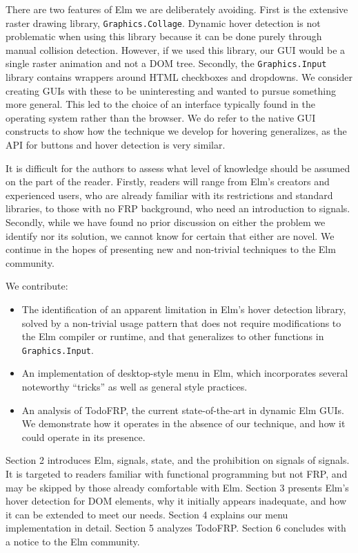 \documentclass{article}
\begin{document}
There are two features of Elm we are deliberately avoiding. First is the
extensive raster drawing library, \texttt{Graphics.Collage}. Dynamic
hover detection is not problematic when using this library because it
can be done purely through manual collision detection. However, if we
used this library, our GUI would be a single raster animation and not a
DOM tree. Secondly, the \texttt{Graphics.Input} library contains
wrappers around HTML checkboxes and dropdowns. We consider creating GUIs
with these to be uninteresting and wanted to pursue something more
general. This led to the choice of an interface typically found in the
operating system rather than the browser. We do refer to the native GUI
constructs to show how the technique we develop for hovering
generalizes, as the API for buttons and hover detection is very similar.

It is difficult for the authors to assess what level of knowledge should
be assumed on the part of the reader. Firstly, readers will range from
Elm's creators and experienced users, who are already familiar with its
restrictions and standard libraries, to those with no FRP background,
who need an introduction to signals. Secondly, while we have found no
prior discussion on either the problem we identify nor its solution, we
cannot know for certain that either are novel. We continue in the hopes
of presenting new and non-trivial techniques to the Elm community.

We contribute:

\begin{itemize}
\itemsep1pt\parskip0pt
\item
  The identification of an apparent limitation in Elm's hover detection
  library, solved by a non-trivial usage pattern that does not require
  modifications to the Elm compiler or runtime, and that generalizes to
  other functions in \texttt{Graphics.Input}.
\item
  An implementation of desktop-style menu in Elm, which incorporates
  several noteworthy ``tricks'' as well as general style practices.
\item
  An analysis of TodoFRP, the current state-of-the-art in dynamic Elm
  GUIs. We demonstrate how it operates in the absence of our technique,
  and how it could operate in its presence.
\end{itemize}

Section 2 introduces Elm, signals, state, and the prohibition on signals of
signals. It is targeted to readers familiar with functional programming but not
FRP, and may be skipped by those already comfortable with Elm. Section 3
presents Elm's hover detection for DOM elements, why it initially appears
inadequate, and how it can be extended to meet our needs. Section 4 explains our
menu implementation in detail. Section 5 analyzes TodoFRP. Section 6 concludes
with a notice to the Elm community.
\end{document}
